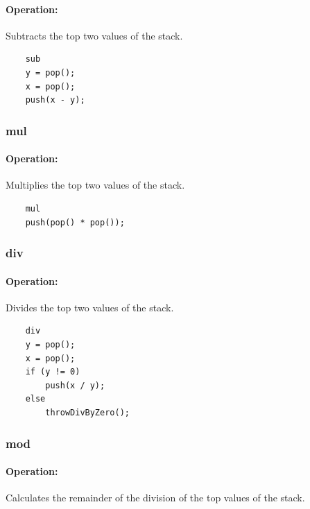 \paragraph{Operation:}
Subtracts the top two values of the stack.

	\begin{lstlisting}
	sub
	y = pop();
	x = pop();
	push(x - y);
	\end{lstlisting}

\subsubsection{mul}

\paragraph{Operation:}
Multiplies the top two values of the stack.

	\begin{lstlisting}
	mul
	push(pop() * pop());
	\end{lstlisting}

\subsubsection{div}

\paragraph{Operation:}
Divides the top two values of the stack.

	\begin{lstlisting}
	div
	y = pop();
	x = pop();
	if (y != 0)
		push(x / y);
	else
		throwDivByZero();
	\end{lstlisting}


\subsubsection{mod}

\paragraph{Operation:}
Calculates the remainder of the division of the top values of the stack.

